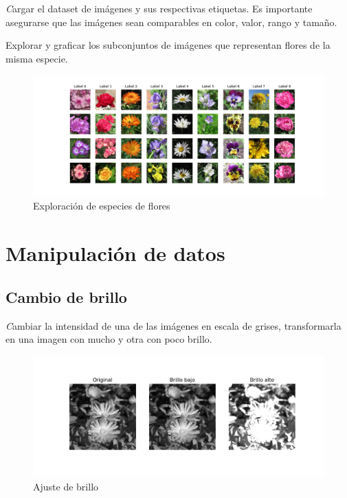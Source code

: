 \documentclass{article}
\begin{document}
{\emph Cargar el dataset de imágenes y sus respectivas etiquetas. Es importante asegurarse que las 
imágenes sean comparables en color, valor, rango y tamaño.

Explorar y graficar los subconjuntos de imágenes que representan flores de la misma
especie.}
\pagebreak

\begin{figure}[h!]
  \centering  
  \includegraphics[width=1\textwidth]{1_ejemplos_flores.png}
  \caption{Exploración de especies de flores}
\end{figure}

\section{Manipulación de datos}

\subsection{Cambio de brillo}

{\emph Cambiar la intensidad de una de las imágenes en escala de grises, transformarla en una imagen con mucho y otra con poco brillo.}

\begin{figure}[h!]
  \centering    
  \includegraphics[width=1\textwidth]{2_brillo.png}
  \caption{Ajuste de brillo}
\end{figure}
\end{document}

